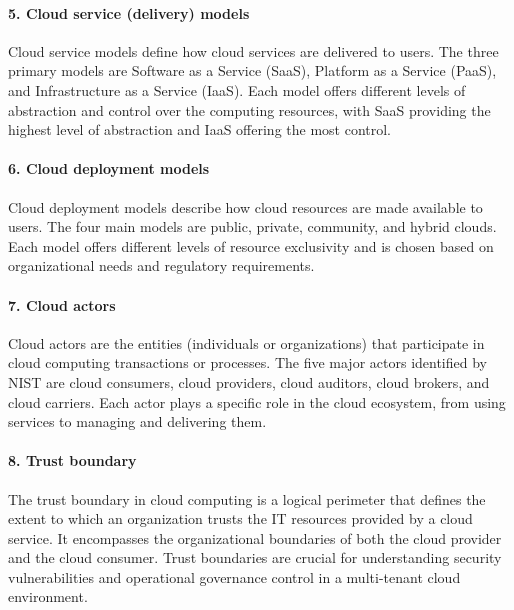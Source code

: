 \documentclass[10pt, landscape]{article}
\begin{document}
\begin{multicols*}{4}
\paragraph{5. Cloud service (delivery)
models}\label{cloud-service-delivery-models}

Cloud service models define how cloud services are delivered to users.
The three primary models are Software as a Service (SaaS), Platform as a
Service (PaaS), and Infrastructure as a Service (IaaS). Each model
offers different levels of abstraction and control over the computing
resources, with SaaS providing the highest level of abstraction and IaaS
offering the most control.

\paragraph{6. Cloud deployment models}\label{cloud-deployment-models}

Cloud deployment models describe how cloud resources are made available
to users. The four main models are public, private, community, and
hybrid clouds. Each model offers different levels of resource
exclusivity and is chosen based on organizational needs and regulatory
requirements.

\paragraph{7. Cloud actors}\label{cloud-actors}

Cloud actors are the entities (individuals or organizations) that
participate in cloud computing transactions or processes. The five major
actors identified by NIST are cloud consumers, cloud providers, cloud
auditors, cloud brokers, and cloud carriers. Each actor plays a specific
role in the cloud ecosystem, from using services to managing and
delivering them.

\paragraph{8. Trust boundary}\label{trust-boundary-1}

The trust boundary in cloud computing is a logical perimeter that
defines the extent to which an organization trusts the IT resources
provided by a cloud service. It encompasses the organizational
boundaries of both the cloud provider and the cloud consumer. Trust
boundaries are crucial for understanding security vulnerabilities and
operational governance control in a multi-tenant cloud environment.


\end{multicols*}
\end{document}
